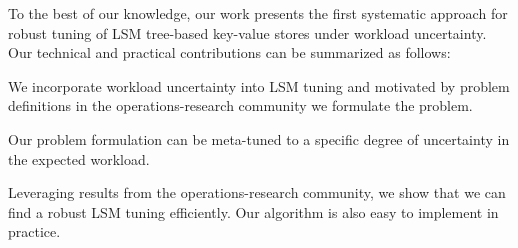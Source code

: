 %
To the best of our knowledge, our work presents the first systematic approach
    for robust tuning of LSM tree-based key-value stores under workload uncertainty. 
%
Our technical and practical contributions can be summarized as follows: %
\squishlist
	\item We incorporate workload uncertainty into LSM tuning and motivated by 
	problem definitions in the operations-research community we formulate the {\robustw} problem.  
	\item Our problem formulation can be meta-tuned to a specific degree of uncertainty in the expected workload.
	\item Leveraging results from the operations-research community, we show that we can find a robust LSM tuning efficiently. Our algorithm is also easy to implement in practice.
